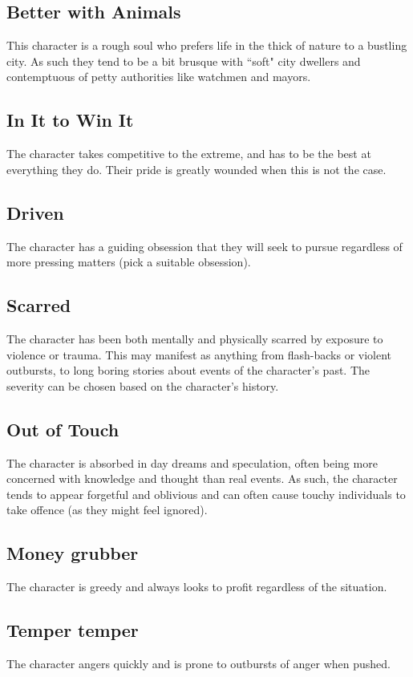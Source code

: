 \documentclass[a4paper,10pt,oneside]{book}
\begin{document}
\subsection{Better with Animals}
This character is a rough soul who prefers life in the thick of nature to a bustling city. As such they tend to be a bit brusque with ``soft" city dwellers and contemptuous of petty authorities like watchmen and mayors.

\subsection{In It to Win It}
The character takes competitive to the extreme, and has to be the best at everything they do. Their pride is greatly wounded when this is not the case. 

\subsection{Driven}
The character has a guiding obsession that they will seek to pursue regardless of more pressing matters (pick a suitable obsession).

\subsection{Scarred}
The character has been both mentally and physically scarred by exposure to violence or trauma. This may manifest as anything from flash-backs or violent outbursts, to long boring stories about events of the character's past. The severity can be chosen based on the character's history.

\subsection{Out of Touch}
The character is absorbed in day dreams and speculation, often being more concerned with knowledge and thought than real events. As such, the character tends to appear forgetful and oblivious and can often cause touchy individuals to take offence (as they might feel ignored).

\subsection{Money grubber}
The character is greedy and always looks to profit regardless of the situation.

\subsection{Temper temper}
The character angers quickly and is prone to outbursts of anger when pushed.
\end{document}
